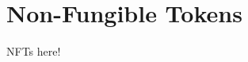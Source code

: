 \documentclass[../main.tex]{subfiles}
\begin{document}
\section{Non-Fungible Tokens}
\label{sec:non_fungible_tokens}
NFTs here!
\end{document}
